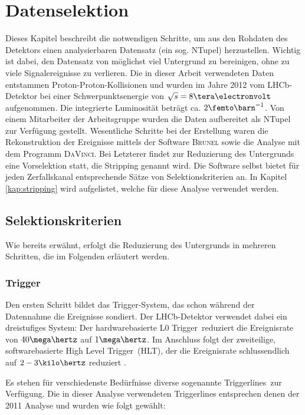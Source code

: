 \chapter{Datenselektion} \label{kap:datenselektion}
Dieses Kapitel beschreibt die notwendigen Schritte, um aus den Rohdaten des Detektors einen analysierbaren Datensatz (ein sog. NTupel) herzustellen. Wichtig ist dabei, den Datensatz von möglichst viel Untergrund zu bereinigen, ohne zu viele Signalereignisse zu verlieren. Die in dieser Arbeit verwendeten Daten entstammen Proton-Proton-Kollisionen und wurden im Jahre 2012 vom LHCb-Detektor bei einer Schwerpunktsenergie von $\sqrt{s} = 8\tera\electronvolt$ aufgenommen. Die integrierte Luminosität beträgt ca. $2\femto\barn^{-1}$. Von einem Mitarbeiter der Arbeitsgruppe wurden die Daten aufbereitet als NTupel zur Verfügung gestellt. Wesentliche Schritte bei der Erstellung waren die Rekonstruktion der Ereignisse mittels der Software \textsc{Brunel} sowie die Analyse mit dem Programm \textsc{DaVinci}. Bei Letzterer findet zur Reduzierung des Untergrunds eine Vorselektion statt, die Stripping genannt wird. Die Software selbst bietet für jeden Zerfallskanal entsprechende Sätze von Selektionskriterien an. In Kapitel \ref{kap:stripping} wird aufgelistet, welche für diese Analyse verwendet werden.

\section{Selektionskriterien}
Wie bereits erwähnt, erfolgt die Reduzierung des Untergrunds in mehreren Schritten, die im Folgenden erläutert werden.

\subsection{Trigger} \label{kap:trigger}
Den ersten Schritt bildet das Trigger-System, das schon während der Datennahme die Ereignisse sondiert. Der LHCb-Detektor verwendet dabei ein dreistufiges System: Der hardwarebasierte \glqq L0 Trigger\grqq\ reduziert die Ereignisrate von $40\mega\hertz$ auf $1\mega\hertz$. Im Anschluss folgt der zweiteilige, softwarebasierte \glqq High Level Trigger\grqq\ (HLT), der die Ereignisrate schlussendlich auf $2-3\kilo\hertz$ reduziert \cite{trigger}.

Es stehen für verschiedenste Bedürfnisse diverse sogenannte \glqq Triggerlines\grqq\ zur Verfügung. Die in dieser Analyse verwendeten Triggerlines entsprechen denen der 2011 Analyse \cite{lhcb-paper} und wurden wie folgt gewählt:

